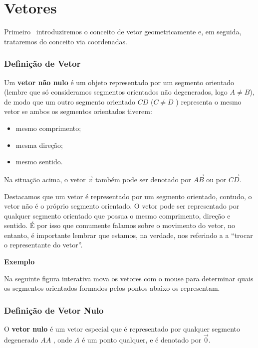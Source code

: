 \documentclass[
  brazilian,
  letterpaper,
  DIV=11,
  numbers=noendperiod]{scrreprt}
\providecommand{\tightlist}{%
  \setlength{\itemsep}{0pt}\setlength{\parskip}{0pt}}
\theoremstyle{definition}
\theoremstyle{plain}
\theoremstyle{definition}
\theoremstyle{remark}
\begin{document}

\chapter{Vetores}\label{vetores}

Primeiro~ introduziremos o conceito de vetor geometricamente e, em
seguida, trataremos do conceito via coordenadas.

\subsection{Definição de Vetor}\label{definiuxe7uxe3o-de-vetor}

Um \textbf{vetor não nulo} é um objeto representado por um segmento
orientado (lembre que só consideramos segmentos orientados não
degenerados, logo \(A\neq B\)), de modo que um outro segmento orientado
\(CD\) (\(C\neq D\) ) representa o mesmo vetor se ambos os segmentos
orientados tiverem:

\begin{itemize}
\tightlist
\item
  mesmo comprimento;
\item
  mesma direção;
\item
  mesmo sentido.
\end{itemize}

Na situação acima, o vetor \(\vec{v}\) também pode ser denotado por
\(\overrightarrow{AB}\) ou por \(\overrightarrow{CD}\).

Destacamos que um vetor é representado por um segmento orientado,
contudo, o vetor não é o próprio segmento orientado. O vetor pode ser
representado por qualquer segmento orientado que possua o mesmo
comprimento, direção e sentido. É por isso que comumente falamos sobre o
movimento do vetor, no entanto, é importante lembrar que estamos, na
verdade, nos referindo a a ``trocar o representante do vetor''.

\textbf{Exemplo}

Na seguinte figura interativa mova os vetores com o mouse para
determinar quais os segmentos orientados formados pelos pontos abaixo os
representam.

\subsection{Definição de Vetor
Nulo}\label{definiuxe7uxe3o-de-vetor-nulo}

O \textbf{vetor nulo} é um vetor especial que é representado por
qualquer segmento degenerado \(AA\) , onde \(A\) é um ponto qualquer, e
é denotado por \(\vec{0}\).
\end{document}
